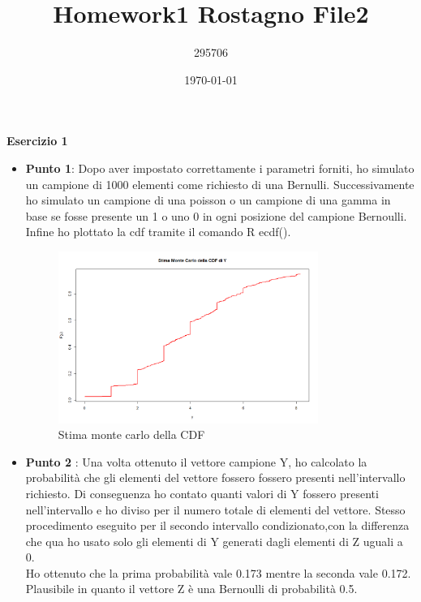 \documentclass[a4paper,12pt]{article}
\begin{document}
	\title{\textbf{Homework1 Rostagno File2}}
	\author{295706}
	\date{\today}
	\maketitle
	
\centering \textbf{Esercizio 1}\\
\begin{itemize}
	\item \textbf{Punto 1}: Dopo aver impostato correttamente i parametri forniti, ho simulato un campione di 1000 elementi come richiesto di una Bernulli. Successivamente ho simulato un campione di una poisson o un campione di una gamma in base se fosse presente un 1 o uno 0 in ogni posizione del campione Bernoulli. Infine ho plottato la cdf tramite il comando R ecdf().
	\begin{figure}[h] %
		\centering %
		\includegraphics[width=0.8\textwidth]{fRip.png} %
		\caption{Stima monte carlo della CDF} %
		\label{fig:immagine} %
	\end{figure}
	\item  \textbf{Punto 2} : Una volta ottenuto il vettore campione Y, ho calcolato la probabilità che gli elementi del vettore fossero fossero presenti nell'intervallo richiesto. Di conseguenza ho contato quanti valori di Y fossero presenti nell'intervallo e ho diviso per il numero totale di elementi del vettore. Stesso procedimento eseguito per il secondo intervallo condizionato,con la differenza che qua ho usato solo gli elementi di Y generati dagli elementi di Z uguali a 0.\\
	Ho ottenuto che la prima probabilità vale 0.173 mentre la seconda vale 0.172. Plausibile in quanto il vettore Z è una Bernoulli di probabilità 0.5. 

\end{itemize}
\end{document}
